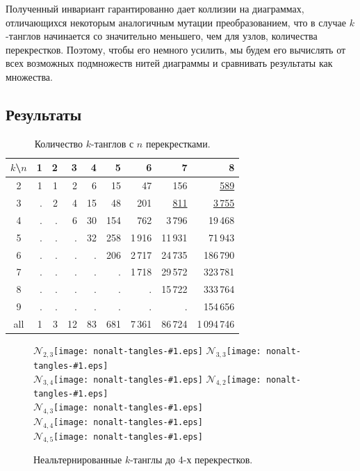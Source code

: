 \documentclass[12pt]{article}
\theoremstyle{plain}
\theoremstyle{definition}
\begin{document}
		Полученный инвариант гарантированно дает коллизии на диаграммах, отличающихся некоторым аналогичным мутации преобразованием, что в
		случае $k$-танглов начинается со значительно меньшего, чем для узлов, количества перекрестков. Поэтому, чтобы его немного усилить,
		мы будем его вычислять от всех возможных подмножеств нитей диаграммы и сравнивать результаты как множества.

	\subsection{Результаты}

		\begin{table}[ht]
			\caption{Количество $k$-танглов с $n$ перекрестками.\label{table:non-alternating-tangles}}
			\centering
			\let\ul=\underline
			\begin{tabular}{|c||r|r|r|r|r|r|r|r|}
			\hline
			$k$\textbackslash $n$
			    & 1 & 2 &  3 &  4 &   5 &      6 &        7 &           8 \\
			\hline\hline
			2   & 1 & 1 &  2 &  6 &  15 &     47 &      156 &    \ul{589} \\
			3   & . & 2 &  4 & 15 &  48 &    201 & \ul{811} & \ul{3\,755} \\
			4   & . & . &  6 & 30 & 154 &    762 &   3\,796 &     19\,468 \\
			5   & . & . &  . & 32 & 258 & 1\,916 &  11\,931 &     71\,943 \\
			6   & . & . &  . &  . & 206 & 2\,717 &  24\,735 &    186\,790 \\
			7   & . & . &  . &  . &   . & 1\,718 &  29\,572 &    323\,781 \\
			8   & . & . &  . &  . &   . &      . &  15\,722 &    333\,764 \\
			9   & . & . &  . &  . &   . &      . &        . &    154\,656 \\
			\hline
			all & 1 & 3 & 12 & 83 & 681 & 7\,361 &  86\,724 & 1\,094\,746 \\
			\hline
			\end{tabular}
		\end{table}


		\begin{figure}[ht]
			\centering
			\def\pic#1{\hbox{\protect\texttt{[image: nonalt-tangles-\#1.eps]}}}

			$\mathcal N_{2,3}$\pic{1} \qquad $\mathcal N_{3,3}$\pic{2} \\
			$\mathcal N_{3,4}$\pic{3} \qquad $\mathcal N_{4,2}$\pic{4} \\
			$\mathcal N_{4,3}$\pic{5} \\
			$\mathcal N_{4,4}$\pic{6} \\
			$\mathcal N_{4,5}$\pic{7}

			\caption{\footnotesize Неальтернированные $k$-танглы до 4-х перекрестков.}
		\end{figure}
\end{document}
